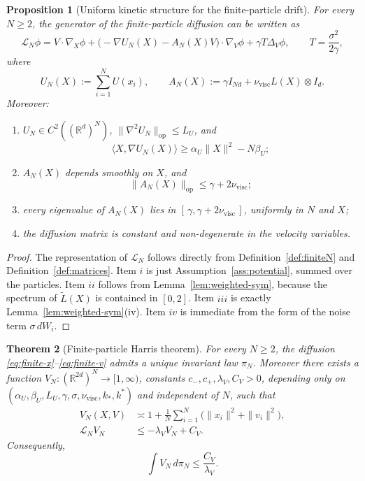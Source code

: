 \documentclass[11pt]{article}
\newtheorem{theorem}{Theorem}[section]
\newtheorem{proposition}[theorem]{Proposition}
\theoremstyle{definition}
\theoremstyle{remark}
\newcommand{\R}{\mathbb{R}}
\begin{document}
\begin{proposition}[Uniform kinetic structure for the finite-particle drift]\label{prop:finite-harris-struct}
For every \(N\geq2\), the generator of the finite-particle diffusion can be
written as
\[
\mathcal L_N\phi
=
V\cdot \nabla_X\phi
+\bigl(-\nabla U_N(X)-A_N(X)V\bigr)\cdot \nabla_V\phi
+\gamma T\Delta_V\phi,
\qquad
T=\frac{\sigma^2}{2\gamma},
\]
where
\[
U_N(X):=\sum_{i=1}^N U(x_i),
\qquad
A_N(X):=\gamma I_{Nd}+\nu_{\mathrm{visc}}L(X)\otimes I_d.
\]
Moreover:
\begin{enumerate}[label=\textnormal{(\roman*)},leftmargin=1.5em]
\item \(U_N\in C^2((\R^d)^N)\), \(\|\nabla^2 U_N\|_{\mathrm{op}}\leq L_U\), and
\[
\langle X,\nabla U_N(X)\rangle
\geq
\alpha_U\|X\|^2-N\beta_U;
\]
\item \(A_N(X)\) depends smoothly on \(X\), and
\[
\|A_N(X)\|_{\mathrm{op}}\leq \gamma+2\nu_{\mathrm{visc}};
\]
\item every eigenvalue of \(A_N(X)\) lies in
\([\,\gamma,\gamma+2\nu_{\mathrm{visc}}\,]\), uniformly in \(N\) and \(X\);
\item the diffusion matrix is constant and non-degenerate in the velocity
variables.
\end{enumerate}
\end{proposition}

\begin{proof}
The representation of \(\mathcal L_N\) follows directly from
Definition~\ref{def:finiteN} and Definition~\ref{def:matrices}. Item \(i\) is
just Assumption~\ref{ass:potential}, summed over the particles. Item \(ii\)
follows from Lemma~\ref{lem:weighted-sym}, because the spectrum of
\(\widetilde L(X)\) is contained in \([0,2]\). Item \(iii\) is exactly
Lemma~\ref{lem:weighted-sym}(iv). Item \(iv\) is immediate from the form of the
noise term \(\sigma\,dW_i\).
\end{proof}

\begin{theorem}[Finite-particle Harris theorem]\label{thm:finite-harris}
For every \(N\geq2\), the diffusion
\eqref{eq:finite-x}--\eqref{eq:finite-v} admits a unique invariant law
\(\pi_N\). Moreover there exists a function \(V_N:(\R^{2d})^N\to[1,\infty)\),
constants \(c_-,c_+,\lambda_V,C_V>0\), depending only on
\((\alpha_U,\beta_U,L_U,\gamma,\sigma,\nu_{\mathrm{visc}},k_*,k^*)\) and
independent of \(N\), such that
\begin{align}
V_N(X,V)
&\asymp
1+\frac1N\sum_{i=1}^N \bigl(\|x_i\|^2+\|v_i\|^2\bigr),
\label{eq:VN-equiv}\\
\mathcal L_N V_N
&\leq
-\lambda_V V_N+C_V.
\label{eq:VN-drift}
\end{align}
Consequently,
\begin{equation}\label{eq:VN-invariant}
\int V_N\,d\pi_N\leq \frac{C_V}{\lambda_V}.
\end{equation}
\end{theorem}
\end{document}
